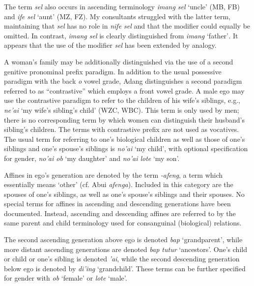 The term \textit{sel} also occurs in ascending terminology \textit{imang sel} `uncle' (MB, FB) and \textit{ife sel} `aunt' (MZ, FZ). My consultants struggled with the latter term, maintaining that \textit{sel} has no role in \textit{nife sel} and that the modifier could equally be omitted. In contrast, \textit{imang sel} is clearly distinguished from \textit{imang} `father'\textit{.} It appears that the use of the modifier \textit{sel} has been extended by analogy.

A woman's family may be additionally distinguished via the use of a second genitive pronominal prefix paradigm. In addition to the usual possessive paradigm with the back \textit{o} vowel grade, Adang distinguishes a second paradigm referred to as ``contrastive'' \citep{Haan2001} which employs a front vowel grade. A male ego may use the contrastive paradigm to refer to the children of his wife's siblings, e.g., \textit{ne'ai} `my wife's sibling's child' (WZC, WBC). This term is only used by men; there is no corresponding term by which women can distinguish their husband's sibling's children. The terms with contrastive prefix are not used as vocatives. The usual term for referring to one's biological children as well as those of one's siblings and one's spouse's siblings is \textit{no'ai} `my child', with optional specification for gender, \textit{no'ai ob} `my daughter' and \textit{no'ai lote} `my son'.

Affines in ego's generation are denoted by the term \textit{{}-afeng}, a term which essentially means `other' (cf. Abui \textit{afenga}). Included in this category are the spouses of one's siblings, as well as one's spouse's siblings and their spouses. No special terms for affines in ascending and descending generations have been documented. Instead, ascending and descending affines are referred to by the same parent and child terminology used for consanguinal (biological) relations.

The second ascending generation above ego is denoted \textit{bap} `grandparent', while more distant ascending generations are denoted \textit{bap tutur} `ancestors'. One's child or child or one's sibling is denoted \textit{'ai}, while the second descending generation below ego is denoted by \textit{di'ing} `grandchild'. These terms can be further specified for gender with \textit{ob} `female' or \textit{lote} `male'.





